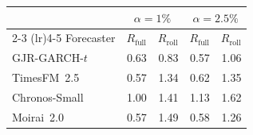 \begin{tabular}{l rr rr}
\toprule
& \multicolumn{2}{c}{$\alpha = 1\%$} & \multicolumn{2}{c}{$\alpha = 2.5\%$} \\
\cmidrule(lr){2-3} \cmidrule(lr){4-5}
Forecaster & $R_{\mathrm{full}}$ & $R_{\mathrm{roll}}$ & $R_{\mathrm{full}}$ & $R_{\mathrm{roll}}$ \\
\midrule
GJR-GARCH-$t$ & 0.63 & 0.83 & 0.57 & 1.06 \\
TimesFM~2.5 & 0.57 & 1.34 & 0.62 & 1.35 \\
Chronos-Small & 1.00 & 1.41 & 1.13 & 1.62 \\
Moirai~2.0 & 0.57 & 1.49 & 0.58 & 1.26 \\
\bottomrule
\end{tabular}
